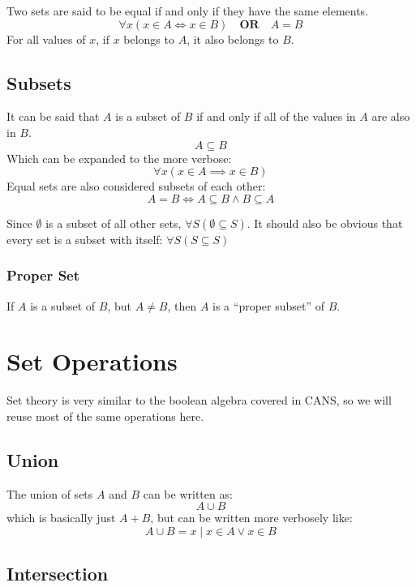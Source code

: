 Two sets are said to be equal if and only if they have the same elements.
\[
    \forall x(x \in A \iff x \in B) \quad \mathrm{\textbf{OR}} \quad A = B
\]
For all values of \(x\), if \(x\) belongs to \(A\), it also belongs to \(B\).

\subsection{Subsets}\label{sub:subsets}

It can be said that \(A\) is a subset of \(B\) if and only if all of the values in \(A\) are also in \(B\).
\[
    A \subseteq B
\]
Which can be expanded to the more verbose:
\[
    \forall x (x \in A \implies x \in B)
\]
Equal sets are also considered subsets of each other:
\[
    A=B \iff A \subseteq B \land B \subseteq A
\]
\begin{note}
    Since \(\emptyset\) is a subset of all other sets, \(\forall S(\emptyset \subseteq S)\).
    It should also be obvious that every set is a subset with itself: \(\forall S ( S \subseteq S )\)
\end{note}

\subsubsection{Proper Set}\label{ssub:proper_set}

If \(A\) is a subset of \(B\), but \(A \neq B\), then \(A\) is a ``proper subset'' of \(B\).

\section{Set Operations}\label{sec:set_operations}

Set theory is very similar to the boolean algebra covered in CANS, so we will reuse most of the same operations here.

\subsection{Union}\label{sub:unionpafour}

The union of sets \(A\) and \(B\) can be written as:
\[
    A \cup B
\]
which is basically just \(A + B\), but can be written more verbosely like:
\[
    A \cup B = {x \mid x \in A \lor x \in B}
\]

\subsection{Intersection}\label{sub:intersection}

